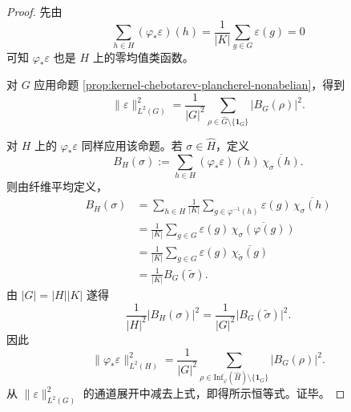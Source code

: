 \begin{proof}
先由
\[
\sum_{h\in H}(\varphi_\ast\varepsilon)(h)
=
\frac1{|K|}\sum_{g\in G}\varepsilon(g)=0
\]
可知 \(\varphi_\ast\varepsilon\) 也是 \(H\) 上的零均值类函数。

对 \(G\) 应用命题 \ref{prop:kernel-chebotarev-plancherel-nonabelian}，得到
\[
\|\varepsilon\|_{L^2(G)}^2
=
\frac1{|G|^2}
\sum_{\rho\in\widehat G\setminus\{\mathbf 1_G\}}
\bigl|B_G(\rho)\bigr|^2.
\]

对 \(H\) 上的 \(\varphi_\ast\varepsilon\) 同样应用该命题。若 \(\sigma\in \widehat H\)，定义
\[
B_H(\sigma):=\sum_{h\in H}(\varphi_\ast\varepsilon)(h)\,\overline{\chi_\sigma(h)}.
\]
则由纤维平均定义，
\[
\begin{aligned}
B_H(\sigma)
&=
\sum_{h\in H}
\frac1{|K|}
\sum_{g\in\varphi^{-1}(h)}
\varepsilon(g)\,\overline{\chi_\sigma(h)}\\
&=
\frac1{|K|}
\sum_{g\in G}
\varepsilon(g)\,\overline{\chi_\sigma(\varphi(g))}\\
&=
\frac1{|K|}
\sum_{g\in G}
\varepsilon(g)\,\overline{\chi_{\widetilde \sigma}(g)}\\
&=
\frac1{|K|}B_G(\widetilde \sigma).
\end{aligned}
\]
由 \(|G|=|H||K|\) 遂得
\[
\frac1{|H|^2}\bigl|B_H(\sigma)\bigr|^2
=
\frac1{|G|^2}\bigl|B_G(\widetilde \sigma)\bigr|^2.
\]
因此
\[
\|\varphi_\ast\varepsilon\|_{L^2(H)}^2
=
\frac1{|G|^2}
\sum_{\rho\in \mathrm{Inf}_\varphi(\widehat H)\setminus\{\mathbf 1_G\}}
\bigl|B_G(\rho)\bigr|^2.
\]
从 \(\|\varepsilon\|_{L^2(G)}^2\) 的通道展开中减去上式，即得所示恒等式。证毕。
\end{proof}

